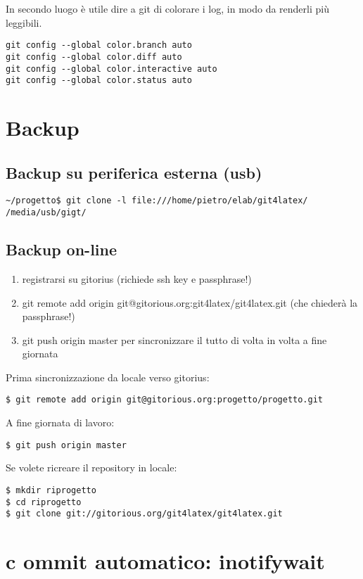 \documentclass[a4paper,12pt,oneside]{article}
\begin{document}
In secondo luogo è utile dire a git di colorare i log, in modo da renderli più
leggibili.
\begin{lstlisting}
git config --global color.branch auto
git config --global color.diff auto
git config --global color.interactive auto
git config --global color.status auto
\end{lstlisting}

\section{Backup}
\subsection{Backup su periferica esterna (usb)}
\begin{lstlisting}
~/progetto$ git clone -l file:///home/pietro/elab/git4latex/ /media/usb/gigt/
\end{lstlisting}

\subsection{Backup on-line}

\begin{enumerate}
\item registrarsi su gitorius (richiede ssh key e passphrase!)
\item git remote add origin git@gitorious.org:git4latex/git4latex.git
(che chiederà la passphrase!)
\item git push origin master
per sincronizzare il tutto di volta in volta a fine giornata
\end{enumerate}

Prima sincronizzazione da locale verso gitorius:
\begin{lstlisting}
$ git remote add origin git@gitorious.org:progetto/progetto.git
\end{lstlisting}

A fine giornata di lavoro:
\begin{lstlisting}
$ git push origin master
\end{lstlisting}

Se volete ricreare il repository in locale:
\begin{lstlisting}
$ mkdir riprogetto
$ cd riprogetto
$ git clone git://gitorious.org/git4latex/git4latex.git
\end{lstlisting}

\section{c  ommit automatico: inotifywait}
\end{document}
